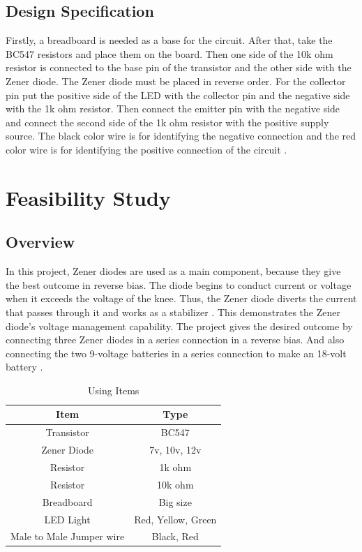 \subsection{Design Specification}
\onehalfspacing

 Firstly, a breadboard is needed as a base for the circuit. After that, take the BC547 resistors and place them on the board. Then one side of the 10k ohm resistor is connected to the base pin of the transistor and the other side with the Zener diode. The Zener diode must be placed in reverse order. For the collector pin put the positive side of the LED with the collector pin and the negative side with the 1k ohm resistor. Then connect the emitter pin with the negative side and connect the second side of the 1k ohm resistor with the positive supply source. The black color wire is for identifying the negative connection and the red color wire is for identifying the positive connection of the circuit \cite{b3}. 
\section{Feasibility Study}

\subsection{Overview}
 In this project, Zener diodes are used as a main component, because they give the best outcome in reverse bias. The diode begins to conduct current or voltage when it exceeds the voltage of the knee. Thus, the Zener diode diverts the current that passes through it and works as a stabilizer \cite{b2}. This demonstrates the Zener diode's voltage management capability. The project gives the desired outcome by connecting three Zener diodes in a series connection in a reverse bias. And also connecting the two 9-voltage batteries in a series connection to make an 18-volt battery   \cite{Electronics_Projects_for_Dummies}.
\vspace{.1cm}

\begin{table}[h!]
\centering
\begin{tabular}{|  c  |c|}
\hline
\textbf{      Item      } & \textbf{  Type  }  \\
\hline
Transistor &   BC547   \\
\hline
 Zener Diode  & 7v, 10v, 12v     \\

\hline
 Resistor & 1k ohm  \\
\hline
 Resistor & 10k ohm  \\
\hline
Breadboard  & Big size  \\
\hline
LED Light  & Red, Yellow, Green  \\
\hline
Male to Male Jumper wire  & Black, Red\\

\hline
\end{tabular}
\caption{Using Items }
\end{table}



